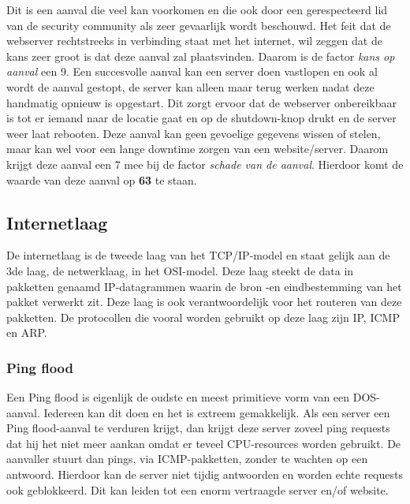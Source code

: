 \documentclass[pdftex,a4paper,12pt]{report}
\begin{document}
Dit is een aanval die veel kan voorkomen en die ook door een gerespecteerd lid van de security community \cite{Bowne2013} als zeer gevaarlijk wordt beschouwd. Het feit dat de webserver rechtstreeks in verbinding staat met het internet, wil zeggen dat de kans zeer groot is dat deze aanval zal plaatsvinden. Daarom is de factor \textit{kans op aanval} een 9. Een succesvolle aanval kan een server doen vastlopen en ook al wordt de aanval gestopt, de server kan alleen maar terug werken nadat deze handmatig opnieuw is opgestart. Dit zorgt ervoor dat de webserver onbereikbaar is tot er iemand naar de locatie gaat en op de shutdown-knop drukt en de server weer laat rebooten. Deze aanval kan geen gevoelige gegevens wissen of stelen, maar kan wel voor een lange downtime zorgen van een website/server. Daarom krijgt deze aanval een 7 mee bij de factor \textit{schade van de aanval}. Hierdoor komt de waarde van deze aanval op \textbf{63} te staan.

\subsection{Internetlaag}
De internetlaag is de tweede laag van het TCP/IP-model en staat gelijk aan de 3de laag, de netwerklaag, in het OSI-model. Deze laag steekt de data in pakketten genaamd IP-datagrammen waarin de bron -en eindbestemming van het pakket verwerkt zit. Deze laag is ook verantwoordelijk voor het routeren van deze pakketten. De protocollen die vooral worden gebruikt op deze laag zijn IP, ICMP en ARP. \citep{Thomas2013}

\subsubsection{Ping flood}
Een Ping flood is eigenlijk de oudste en meest primitieve vorm van een DOS-aanval. Iedereen kan dit doen en het is extreem gemakkelijk. Als een server een Ping flood-aanval te verduren krijgt, dan krijgt deze server zoveel ping requests dat hij het niet meer aankan omdat er teveel CPU-resources worden gebruikt. De aanvaller stuurt dan pings, via ICMP-pakketten, zonder te wachten op een antwoord. Hierdoor kan de server niet tijdig antwoorden en worden echte requests ook geblokkeerd. Dit kan leiden tot een enorm vertraagde server en/of website. \citep{Grid2010}
\end{document}

